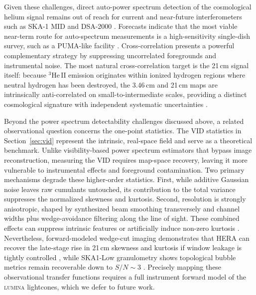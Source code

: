\documentclass[apj,twocolumn, appendixfloats, twocolappendix, numberedappendix, tighten]{openjournal}
\DeclareRobustCommand{\lumina}{\mbox{\textsc{lumina}}\xspace}
\begin{document}
Given these challenges, direct auto-power spectrum detection of the cosmological helium signal remains out of reach for current and near-future interferometers such as SKA-1 MID and DSA-2000 \citep{Spina2025}. Forecasts indicate that the most viable near-term route for auto-spectrum measurements is a high-sensitivity single-dish survey, such as a PUMA-like facility \citep{Spina2025}. Cross-correlation presents a powerful complementary strategy by suppressing uncorrelated foregrounds and instrumental noise. The most natural cross-correlation target is the  21\,cm signal itself: because $^3\mathrm{He\,II}$ emission originates within ionized hydrogen regions where neutral hydrogen has been destroyed, the 3.46\,cm and 21\,cm maps are intrinsically anti-correlated on small-to-intermediate scales, providing a distinct cosmological signature with independent systematic uncertainties \citep{Bagla2009, McQuinn2009, Takeuchi2014}.


Beyond the power spectrum detectability challenges discussed above, a related observational question concerns the one-point statistics. The VID statistics in Section~\ref{sec:vid} represent the intrinsic, real-space field and serve as a theoretical benchmark. Unlike visibility-based power spectrum estimators that bypass image reconstruction, measuring the VID requires map-space recovery, leaving it more vulnerable to instrumental effects and foreground contamination. Two primary mechanisms degrade these higher-order statistics. First, while additive Gaussian noise leaves raw cumulants untouched, its contribution to the total variance suppresses the normalized skewness and kurtosis. Second, resolution is strongly anisotropic, shaped by synthesized beam smoothing transversely and channel widths plus wedge-avoidance filtering along the line of sight. These combined effects can suppress intrinsic features or artificially induce non-zero kurtosis \citep{Kittiwisit2016}. Nevertheless, forward-modeled wedge-cut imaging demonstrates that HERA can recover the late-stage rise in 21\,cm skewness and kurtosis if window leakage is tightly controlled \citep{Kittiwisit2022}, while SKA1-Low granulometry shows topological bubble metrics remain recoverable down to $S/N \sim 3$ \citep{Kakiichi2017}. Precisely mapping these observational transfer functions requires a full instrument forward model of the \lumina lightcones, which we defer to future work.


\end{document}
